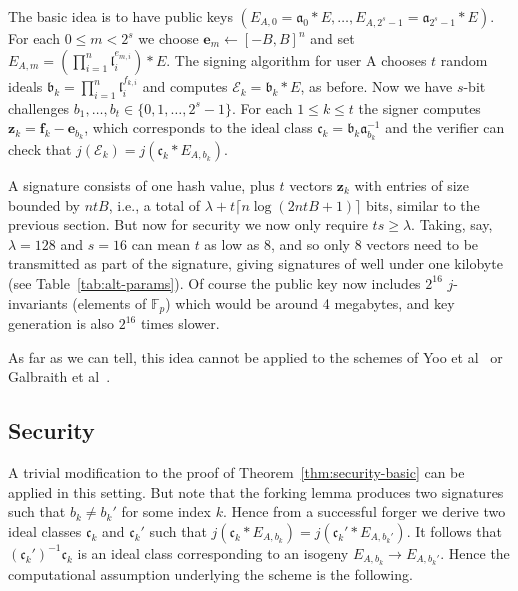 \documentclass{llncs}
\newcommand{\E}{\mathcal{E}}
\newcommand{\F}{\mathbb{F}}
\renewcommand{\a}{\mathfrak{a}}
\renewcommand{\b}{\mathfrak{b}}
\renewcommand{\c}{\mathfrak{c}}
\renewcommand{\l}{\mathfrak{l}}
\newcommand{\e}{\mathbf{e}}
\newcommand{\f}{\mathbf{f}}
\newcommand{\z}{\mathbf{z}}
\begin{document}
The basic idea is to have public keys $( E_{A,0} = \a_0 * E , \dots , E_{A,2^s-1} = \a_{2^s-1} * E )$.
For each $0 \le m < 2^s$ we choose $\e_m \leftarrow [-B,B]^n$ and set $E_{A,m} = ( \prod_{i=1}^n \l_i^{e_{m,i}} ) * E$.
The signing algorithm for user A chooses $t$ random ideals $\b_k = \prod_{i=1}^n \l_i^{f_{k,i}}$ and computes $\E_k = \b_k * E$, as before.
Now we have $s$-bit challenges $b_1, \dots, b_t \in \{0, 1, \dots, 2^s-1 \}$.
For each $1 \le k \le t$ the signer computes $\z_k = \f_k - \e_{b_k}$, which corresponds to the ideal class $\c_k = \b_k \a_{b_k}^{-1} $ and the verifier can check that $j( \E_k ) = j( \c_k * E_{A, b_k})$.

A signature consists of one hash value, plus $t$ vectors $\z_k$ with entries of size bounded by $ntB$, i.e., a total of $\lambda + t\lceil n\log(2ntB + 1)\rceil$ bits, similar to the previous section.
But now for security we now only require $ts \ge \lambda$.
Taking, say, $\lambda = 128$ and $s = 16$ can mean $t$ as low as 8, and so only 8 vectors need to be transmitted as part of the signature, giving signatures of well under one kilobyte (see Table~\ref{tab:alt-params}).
Of course the public key now includes $2^{16}$ $j$-invariants (elements of $\F_p$) which would be around 4 megabytes, and key generation is also $2^{16}$ times slower.


As far as we can tell, this idea cannot be applied to the schemes of Yoo et al~\cite{YAJJS17} or Galbraith et al~\cite{GPS17}.





\subsection{Security}

A trivial modification to the proof of Theorem~\ref{thm:security-basic} can be applied in this setting. But note that the forking lemma produces two signatures such that $b_k \ne b_k'$ for some index $k$.
Hence from a successful forger we derive two ideal classes $\c_k$ and $\c_k'$ such that $j( \c_k * E_{A, b_k} ) = j( \c_k' * E_{A, b_k'})$. It follows that $(\c_k')^{-1} \c_k$ is an ideal class corresponding to an isogeny $E_{A,b_k} \to E_{A,b_k'}$.
Hence the computational assumption underlying the scheme is the following.
\end{document}
